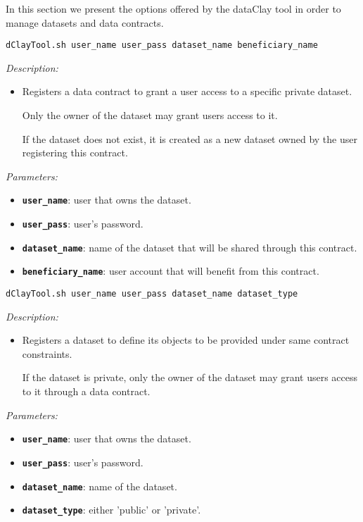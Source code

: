 In this section we present the options offered by the dataClay tool in order to manage datasets and data contracts.

\begin{dBox}
\texttt{dClayTool.sh  \newline user\_name user\_pass dataset\_name beneficiary\_name}
\LINE

{\it Description:}

\begin{itemize}
    \item Registers a data contract to grant a user access to a specific private dataset.
    
    Only the owner of the dataset may grant users access to it.
    
    If the dataset does not exist, it is created as a new dataset owned by the user registering this contract.
\end{itemize}

{\it Parameters:}

\begin{itemize}
    \item \texttt{\bfseries user\_name}: user that owns the dataset.
    \item \texttt{\bfseries user\_pass}: user's password.
    \item \texttt{\bfseries dataset\_name}: name of the dataset that will be shared through this contract.
    \item \texttt{\bfseries beneficiary\_name}: user account that will benefit from this contract.
\end{itemize}

\end{dBox}


\begin{dBox}
\texttt{dClayTool.sh  \newline user\_name user\_pass dataset\_name dataset\_type}
\LINE

{\it Description:}

\begin{itemize}
    \item Registers a dataset to define its objects to be provided under same contract constraints.
    
    If the dataset is private, only the owner of the dataset may grant users access to it through a data contract.
\end{itemize}

{\it Parameters:}

\begin{itemize}
    \item \texttt{\bfseries user\_name}: user that owns the dataset.
    \item \texttt{\bfseries user\_pass}: user's password.
    \item \texttt{\bfseries dataset\_name}: name of the dataset.
    \item \texttt{\bfseries dataset\_type}: either 'public' or 'private'.
\end{itemize}

\end{dBox}

